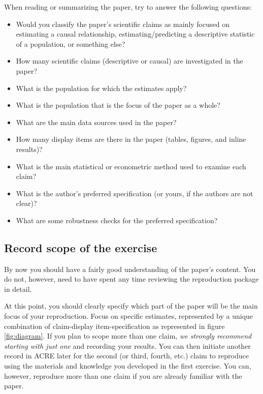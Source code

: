 \documentclass[]{book}
\providecommand{\tightlist}{%
  \setlength{\itemsep}{0pt}\setlength{\parskip}{0pt}}
\begin{document}
When reading or summarizing the paper, try to answer the following questions:

\begin{itemize}
\tightlist
\item
  Would you classify the paper's scientific claims as mainly focused on estimating a causal relationship, estimating/predicting a descriptive statistic of a population, or something else?
\item
  How many scientific claims (descriptive or causal) are investigated in the paper?
\item
  What is the population for which the estimates apply?
\item
  What is the population that is the focus of the paper as a whole?
\item
  What are the main data sources used in the paper?
\item
  How many display items are there in the paper (tables, figures, and inline results)?\\
\item
  What is the main statistical or econometric method used to examine each claim?
\item
  What is the author's preferred specification (or yours, if the authors are not clear)?
\item
  What are some robustness checks for the preferred specification?
\end{itemize}

\hypertarget{declare-estimates}{%
\subsection{Record scope of the exercise}\label{declare-estimates}}

By now you should have a fairly good understanding of the paper's content. You do not, however, need to have spent any time reviewing the reproduction package in detail.

At this point, you should clearly specify which part of the paper will be the main focus of your reproduction. Focus on specific estimates, represented by a unique combination of claim-display item-specification as represented in figure \ref{fig:diagram}. If you plan to scope more than one claim, \emph{we strongly recommend starting with just one} and recording your results. You can then initiate another record in ACRE later for the second (or third, fourth, etc.) claim to reproduce using the materials and knowledge you developed in the first exercise. You can, however, reproduce more than one claim if you are already familiar with the paper.
\end{document}
